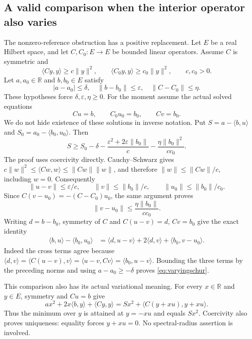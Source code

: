 \documentclass[11pt]{article}
\begin{document}
\subsection*{A valid comparison when the interior operator also varies}
The nonzero-reference obstruction has a positive replacement. Let $E$
be a real Hilbert space, and let $C,C_0:E\to E$ be bounded linear
operators. Assume $C$ is symmetric and
\[
 \langle Cy,y\rangle\geq c\|y\|^2,\qquad
 \langle C_0y,y\rangle\geq c_0\|y\|^2,\qquad c,c_0>0.
\]
Let $a,a_0\in\mathbb R$ and $b,b_0\in E$ satisfy
\[
 |a-a_0|\leq\delta,\quad \|b-b_0\|\leq\varepsilon,\quad
 \|C-C_0\|\leq\eta.
\]
These hypotheses force $\delta,\varepsilon,\eta\geq0$. For the moment
assume the actual solved equations
\[
 Cu=b,\qquad C_0u_0=b_0,\qquad Cv=b_0.
\]
We do not hide existence of these solutions in inverse notation. Put
$S=a-\langle b,u\rangle$ and $S_0=a_0-\langle b_0,u_0\rangle$.
Then
\begin{equation}\label{eq:varyingschur}
 S\geq S_0-\delta
 -\frac{\varepsilon^2+2\varepsilon\|b_0\|}{c}
 -\frac{\eta\|b_0\|^2}{cc_0}.
\end{equation}
The proof uses coercivity directly. Cauchy--Schwarz gives
$c\|w\|^2\leq\langle Cw,w\rangle\leq\|Cw\|\|w\|$,
and therefore $\|w\|\leq\|Cw\|/c$, including $w=0$. Consequently
\[
 \|u-v\|\leq\varepsilon/c,\qquad \|v\|\leq\|b_0\|/c,
 \qquad \|u_0\|\leq\|b_0\|/c_0.
\]
Since $C(v-u_0)=-(C-C_0)u_0$, the same argument proves
\[
 \|v-u_0\|\leq\frac{\eta\|b_0\|}{cc_0}.
\]
Writing $d=b-b_0$, symmetry of $C$ and $C(u-v)=d$, $Cv=b_0$
give the exact identity
\begin{align*}
 \langle b,u\rangle-\langle b_0,u_0\rangle
 &=\langle d,u-v\rangle+2\langle d,v\rangle
                       +\langle b_0,v-u_0\rangle.
\end{align*}
Indeed the cross terms agree because
$\langle d,v\rangle=\langle C(u-v),v\rangle
=\langle u-v,Cv\rangle=\langle b_0,u-v\rangle$.
Bounding the three terms by the preceding norms and using
$a-a_0\geq-\delta$ proves \eqref{eq:varyingschur}.

This comparison also has its actual variational meaning. For every
$x\in\mathbb R$ and $y\in E$, symmetry and $Cu=b$ give
\begin{equation}\label{eq:varyingsquare}
 ax^2+2x\langle b,y\rangle+\langle Cy,y\rangle
 =Sx^2+\langle C(y+xu),y+xu\rangle.
\end{equation}
Thus the minimum over $y$ is attained at $y=-xu$ and equals $Sx^2$.
Coercivity also proves uniqueness: equality forces $y+xu=0$.
No spectral-radius assertion is involved.
\end{document}

